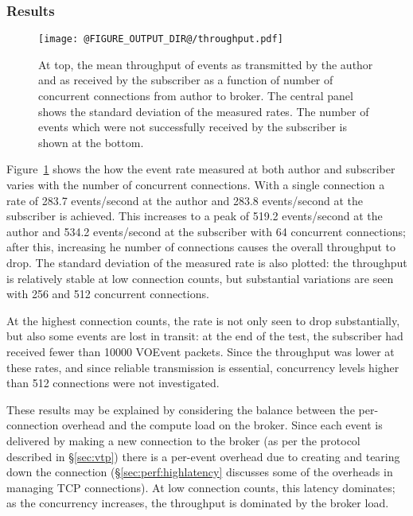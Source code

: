\documentclass[5p,authoryear]{elsarticle}
\begin{document}
\subsubsection{Results}
\label{sec:perf:total:results}

\begin{figure}
  \begin{center}
  \texttt{[image: @FIGURE\_OUTPUT\_DIR@/throughput.pdf]}
  \end{center}

  \caption{At top, the mean throughput of events as transmitted by
  the author and as received by the subscriber as a function of number of
  concurrent connections from author to broker. The central panel shows the
  standard deviation of the measured rates. The number of events which were
  not successfully received by the subscriber is shown at the bottom.}

  \label{fig:throughput}
\end{figure}

Figure~\ref{fig:throughput} shows the how the event rate measured at both
author and subscriber varies with the number of concurrent connections. With a
single connection a rate of 283.7 events/second at the author and 283.8
events/second at the subscriber is achieved. This increases to a peak of 519.2
events/second at the author and 534.2 events/second at the subscriber with 64
concurrent connections; after this, increasing he number of connections causes
the overall throughput to drop. The standard deviation of the measured rate is
also plotted: the throughput is relatively stable at low connection counts,
but substantial variations are seen with 256 and 512 concurrent connections.

At the highest connection counts, the rate is not only seen to drop
substantially, but also some events are lost in transit: at the end of the
test, the subscriber had received fewer than 10000 VOEvent packets. Since the
throughput was lower at these rates, and since reliable transmission is
essential, concurrency levels higher than 512 connections were not
investigated.

These results may be explained by considering the balance between the
per-connection overhead and the compute load on the broker. Since each event
is delivered by making a new connection to the broker (as per the protocol
described in \S\ref{sec:vtp}) there is a per-event overhead due to creating
and tearing down the connection (\S\ref{sec:perf:highlatency} discusses some
of the overheads in managing TCP connections). At low connection counts, this
latency dominates; as the concurrency increases, the throughput is dominated
by the broker load.
\end{document}
